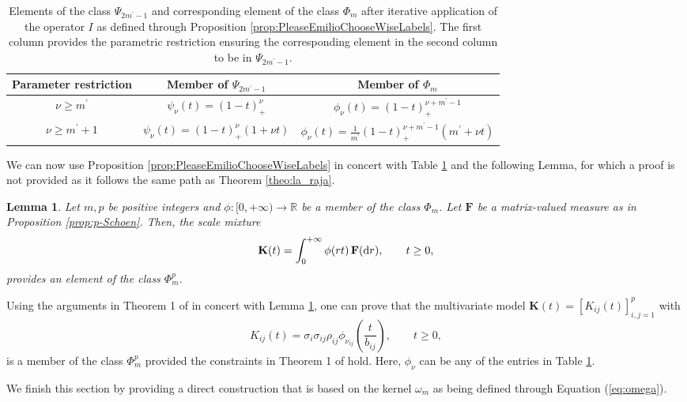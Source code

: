\documentclass[12pt]{article}
\theoremstyle{plain}
\newtheorem{lemma}[theorem]{Lemma}
\theoremstyle{remark}
\newcommand{\round}[1]{\left( #1 \right)}
\newcommand{\R}[0]{\mathbb{R}}
\newcommand{\latMatr}[1]{\mathbf{#1}}          %
\begin{document}
\begingroup
   \renewcommand{\arraystretch}{1.2}
    \begin{center}
        \begin{table}[ht]
            \begin{tabular}{|c|c|c|}
            \hline 
               Parameter restriction  & Member of $\Psi_{2{m^\prime}-1}$ & Member of $\Phi_m$ \\
                 \hline
                 $\nu \ge {m^\prime}$ & $\psi_{\nu}(t) = \left ( 1-t \right )_{+}^{\nu}$ & $ {\phi}_{\nu}(t) = \left ( 1-t \right )_{+}^{\nu+{m^\prime}-1}$ \\
                 $\nu \ge {m^\prime+1}$ & $\psi_{\nu}(t) = \left ( 1-t \right )_{+}^{\nu} \left (1+\nu t \right )$ & ${\phi}_{\nu}(t)= \frac{1}{{m^\prime}} \left (1-t \right )_{+}^{\nu+{m^\prime}-1}  \left ({m^\prime}+\nu t \right )$ \\
                 \hline        
            \end{tabular}
            \vspace{0.1cm}
            \caption{Elements of the class $\Psi_{2{m^\prime}-1}$ and corresponding element of the class $\Phi_{m}$ after iterative application of the operator $I$ as defined through Proposition \ref{prop:PleaseEmilioChooseWiseLabels}. The first column provides the parametric restriction ensuring the corresponding element in the second column to be in $\Psi_{2{m^\prime}-1}$.}
            \label{tab:annal-of-stat-2}
        \end{table}
    \end{center}
\endgroup

We can now use Proposition \ref{prop:PleaseEmilioChooseWiseLabels} in concert with Table \ref{tab:annal-of-stat-2} and the following Lemma, for which a proof is not provided as it follows the same path as Theorem \ref{theo:la_raja}. 
\begin{lemma} 
    \label{lem:tree}
    Let $m,p$ be positive integers and ${\phi}:[0,+\infty)\to \R $ be a member of the class $\Phi_m$. Let ${\latMatr{F}}$ be a matrix-valued measure as in Proposition \ref{prop:p-Schoen}. Then, the scale mixture 
    \begin{equation}
        \label{eq:gen_tree} 
        {\latMatr{K}}(t) = \int_{0}^{+\infty} {\phi}(rt) \,  {\latMatr{F}}({\rm d}r), \qquad t \ge 0, 
    \end{equation}
    provides an element of the class $\Phi_m^p$.
\end{lemma}
Using the arguments in Theorem 1 of \cite{daley2015classes} in concert with Lemma \ref{lem:tree}, one can prove that the multivariate model ${\latMatr{K}}(t) = \left [ K_{ij}(t)\right ]_{i,j=1}^p$ with 
\begin{equation*}
    K_{ij}(t) = \sigma_i \sigma_{ij} \rho_{ij} \phi_{\nu_{ij}}\round{ \frac{t}{b_{ij}}}, \qquad t \ge 0,
\end{equation*}     
is a member of the class $\Phi_{m}^p$ provided the constraints in Theorem 1 of \cite{daley2015classes} hold. Here, ${\phi}_{\nu}$ can be any of the entries in Table \ref{tab:annal-of-stat-2}.\par
We finish this section by providing a direct construction that is based on the kernel $\omega_m $ as being defined through Equation (\ref{eq:omega}).
\end{document}
